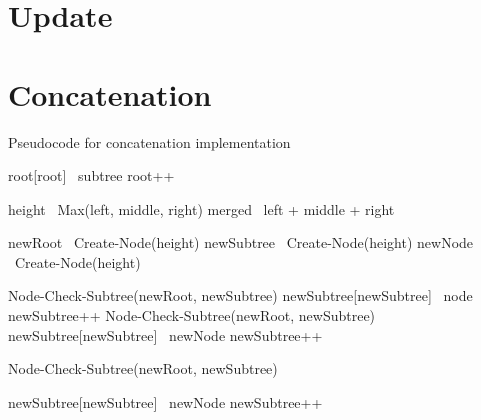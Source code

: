 \section{Update}

\section{Concatenation}

\begin{listing}[ht!]        
    \caption{Pseudocode for concatenation implementation}
    \label{lst:rrb-tree-concat}        

    \begin{algorithmic}       
                \State root[root] \la\ subtree
                \State root++                
            \EndIf
        \EndProcedure

            \State height \la\ Max(left, middle, right)
            \State merged \la\ left + middle + right
            
            \State newRoot \la\ Create-Node(height)            
            \State newSubtree \la\ Create-Node(height)            
            \State newNode \la\ Create-Node(height)

                    \State Node-Check-Subtree(newRoot, newSubtree)
                    \State newSubtree[newSubtree\ts[len]] \la\ node
                    \State newSubtree++
                \Else
                            \State Node-Check-Subtree(newRoot, newSubtree)
                            \State newSubtree[newSubtree\ts[len]] \la\ newNode
                            \State newSubtree++
                        \EndIf
                    \EndFor
                \EndIf
            \EndFor

            \State Node-Check-Subtree(newRoot, newSubtree)

                \State newSubtree[newSubtree\ts[len]] \la\ newNode
                \State newSubtree++
            \EndIf


\end{algorithmic}
\end{listing}
